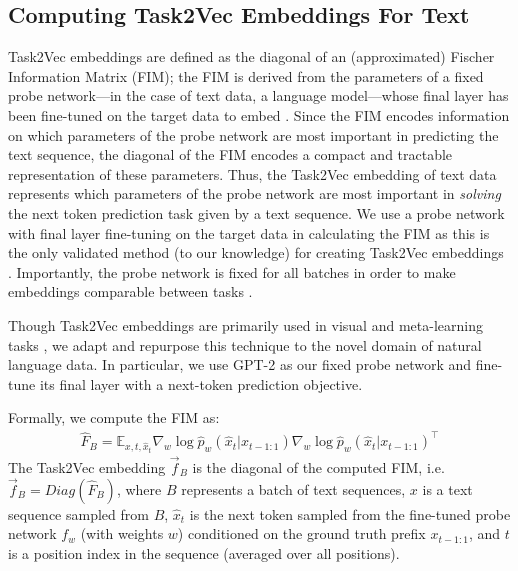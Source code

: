 \subsection{Computing Task2Vec Embeddings For Text}
\label{body:computing_task2vec}
Task2Vec embeddings are defined as the diagonal of an (approximated) Fischer Information Matrix (FIM); the FIM is derived from the parameters of a fixed probe network---in the case of text data, a language model---whose final layer has been fine-tuned on the target data to embed \citep{task2vec}. 
Since the FIM encodes information on which parameters of the probe network are most important in predicting the text sequence, the diagonal of the FIM encodes a compact and tractable representation of these parameters. 
Thus, the Task2Vec embedding of text data represents which parameters of the probe network are most important in \textit{solving} the next token prediction task given by a text sequence. 
We use a probe network with final layer fine-tuning on the target data in calculating the FIM as this is the only validated method (to our knowledge) for creating Task2Vec embeddings \citep{task2vec}. 
Importantly, the probe network is fixed for all batches in order to make embeddings comparable between tasks \citep{task2vec}.

Though Task2Vec embeddings are primarily used in visual and meta-learning tasks \citep{task2vec, curse_low_div, 9577374}, we adapt and repurpose this technique to the novel domain of natural language data. 
In particular, we use GPT-2 \citep{gpt2} as our fixed probe network and fine-tune its final layer with a next-token prediction objective. 

Formally, we compute the FIM as:
\begin{equation*}
\begin{aligned}
    \hat F_B = 
                \mathbb E_{x, t, \hat x_t}
                    \nabla_w \log \hat p_w( \hat x_t | x_{t-1:1}) \nabla_w \log \hat p_w ( \hat x_t | x_{t-1:1})^\top
\end{aligned}
\end{equation*}
The Task2Vec embedding $\vec{f}_B$ is the diagonal of the computed FIM, i.e. $\vec{f}_B = Diag(\hat{F}_B)$, where $B$ represents a batch of text sequences, $x$ is a text sequence sampled from $B$, $\hat{x}_t$ is the next token sampled from the fine-tuned probe network $f_w$ (with weights $w$) conditioned on the ground truth prefix $x_{t-1:1}$, and $t$ is a position index in the sequence (averaged over all positions).

